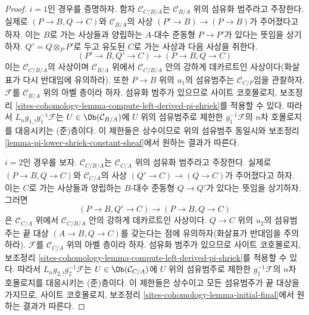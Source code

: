 \begin{proof}
$i=1$인 경우를 증명하자. 함자 $\mathcal{C}_{C/B/A}$는
$\mathcal{C}_{B/A}$ 위의 섬유화 범주라고 주장한다. 실제로
$(P\to B,Q\to C)$와 $\mathcal{C}_{B/A}$의 사상
$(P'\to B)\to(P\to B)$가 주어졌다고 하자. 이는 $B$로 가는 사상들과
양립하는 $A$-대수 준동형 $P\to P'$가 있다는 뜻임을 상기하자.
$Q'=Q\otimes_PP'$로 두고 유도된 $C$로 가는 사상과 다음 사상을 취한다.
$$
(P' \to B, Q' \to C) \longrightarrow (P \to B, Q \to C)
$$
이는 $\mathcal{C}_{C/B/A}$의 사상이며 $\mathcal{C}_{B/A}$ 위에서
$\mathcal{C}_{C/B/A}$ 안의 강하게 데카르트인 사상이다(화살표가 다시
반대임에 유의하라). 또한
$P\to B$ 위의 $u_1$의 섬유범주는 $\mathcal{C}_{C/P}$임을 관찰하자.
$\mathcal{F}$를 $\mathcal{C}_{B/A}$ 위의 아벨 층이라 하자. 섬유화 범주가
있으므로 사이트 코호몰로지, 보조정리
\ref{sites-cohomology-lemma-compute-left-derived-pi-shriek}를 적용할 수 있다.
따라서 $L_ng_{1,!}g_1^{-1}\mathcal{F}$는
$U\in\Ob(\mathcal{C}_{B/A})$에 $U$ 위의 섬유범주로 제한한
$g_1^{-1}\mathcal{F}$의 $n$차 호몰로지를 대응시키는 (준)층이다. 이
제한들은 상수이므로 위의 섬유범주 동일시와 보조정리
\ref{lemma-pi-lower-shriek-constant-sheaf}에서 원하는 결과가 따른다.

\medskip\noindent
$i=2$인 경우를 보자. $\mathcal{C}_{C/B/A}$는 $\mathcal{C}_{C/A}$ 위의
섬유화 범주라고 주장한다. 실제로 $(P\to B,Q\to C)$와
$\mathcal{C}_{C/A}$의 사상 $(Q'\to C)\to(Q\to C)$가 주어졌다고 하자.
이는 $C$로 가는 사상들과 양립하는 $B$-대수 준동형 $Q\to Q'$가 있다는
뜻임을 상기하자. 그러면
$$
(P \to B, Q' \to C) \longrightarrow (P \to B, Q \to C)
$$
은 $\mathcal{C}_{C/A}$ 위에서 $\mathcal{C}_{C/B/A}$ 안의 강하게
데카르트인 사상이다. $Q\to C$ 위의 $u_2$의 섬유범주는 끝 대상
$(A\to B,Q\to C)$를 갖는다는 점에 유의하자(화살표가 반대임을
주의하라). $\mathcal{F}$를 $\mathcal{C}_{C/A}$ 위의 아벨 층이라 하자.
섬유화 범주가 있으므로 사이트 코호몰로지, 보조정리
\ref{sites-cohomology-lemma-compute-left-derived-pi-shriek}를 적용할 수 있다.
따라서 $L_ng_{2,!}g_2^{-1}\mathcal{F}$는
$U\in\Ob(\mathcal{C}_{C/A})$에 $U$ 위의 섬유범주로 제한한
$g_1^{-1}\mathcal{F}$의 $n$차 호몰로지를 대응시키는 (준)층이다. 이
제한들은 상수이고 모든 섬유범주가 끝 대상을 가지므로, 사이트 코호몰로지,
보조정리 \ref{sites-cohomology-lemma-initial-final}에서 원하는 결과가 따른다.


\end{proof}
